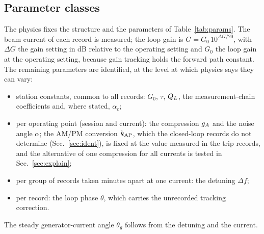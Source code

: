 \subsection{Parameter classes}

The physics fixes the structure and the parameters of Table~\ref{tab:params}. The beam current of each record is measured; the loop gain is $G=G_0\,10^{\Delta G/20}$, with $\Delta G$ the gain setting in dB relative to the operating setting and $G_0$ the loop gain at the operating setting, because gain tracking holds the forward path constant. The remaining parameters are identified, at the level at which physics says they can vary:
\begin{itemize}
\item station constants, common to all records: $G_0$, $\tau$, $Q_L$, the measurement-chain coefficients and, where stated, $\alpha_c$;
\item per operating point (session and current): the compression $g_A$ and the noise angle $\alpha$; the AM/PM conversion $k_\mathrm{AP}$, which the closed-loop records do not determine (Sec.~\ref{sec:ident}), is fixed at the value measured in the trip records, and the alternative of one compression for all currents is tested in Sec.~\ref{sec:explain};
\item per group of records taken minutes apart at one current: the detuning $\Delta f$;
\item per record: the loop phase $\theta$, which carries the unrecorded tracking correction.
\end{itemize}
The steady generator-current angle $\theta_g$ follows from the detuning and the current.
